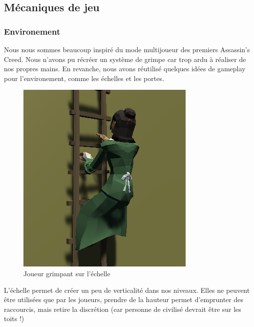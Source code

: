 \documentclass[french, 12pt]{article}
\begin{document}

    \subsection{Mécaniques de jeu}

        \subsubsection{Environement}
            Nous nous sommes beaucoup inspiré du mode multijoueur des premiers Assassin's Creed.
            Nous n'avons pu récréer un système de grimpe car trop ardu à réaliser de nos propres mains.
            En revanche, nous avons réutilisé quelques idées de gameplay pour l'environement, comme les échelles et les portes.\\

            \begin{figure}[hbt!]
                \centering
                \includegraphics{ladder.png}
                \caption{Joueur grimpant sur l'échelle}
            \end{figure}

            L'échelle permet de créer un peu de verticalité dans nos niveaux.
            Elles ne peuvent être utilisées que par les joueurs,
            prendre de la hauteur permet d'emprunter des raccourcis, mais retire la discrétion (car personne de civilisé devrait être sur les toits !) \\
            
\end{document}
